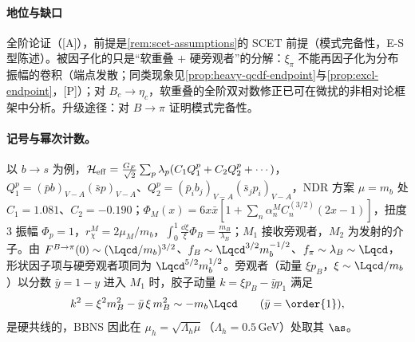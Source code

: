 \paragraph{地位与缺口}
全阶论证（[A]），前提是\cref{rem:scet-assumptions}的 SCET 前提（模式完备性，E-S 型陈述）。被因子化的只是“软重叠 + 硬旁观者”的分解：$\xi_\pi$ 不能再因子化为分布振幅的卷积（端点发散；同类现象见\cref{prop:heavy-qcdf-endpoint}与\cref{prop:excl-endpoint}，[P]）；对 $B_c\to\eta_c$，软重叠的全阶双对数修正已可在微扰的非相对论框架中分析\cite{Bell:2024bxg}。升级途径：对 $B\to\pi$ 证明模式完备性。

\paragraph{记号与幂次计数。}
以 $b\to s$ 为例，$\mathcal H_{\rm eff}=\frac{G_F}{\sqrt2}\sum_{p}\lambda_p(C_1Q_1^p+C_2Q_2^p+\cdots)$，$Q_1^p=(\bar pb)_{V-A}(\bar sp)_{V-A}$、$Q_2^p=(\bar p_ib_j)_{V-A}(\bar s_jp_i)_{V-A}$，NDR 方案 $\mu=m_b$ 处 $C_1=1.081$、$C_2=-0.190$\cite[表~1]{BenekeEtAl2001}；$\Phi_M(x)=6x\bar x[1+\sum_n\alpha_n^MC_n^{(3/2)}(2x-1)]$，扭度 3 振幅 $\Phi_p=1$，$r_\chi^M=2\mu_M/m_b$，$\int_0^1\frac{\dd\xi}{\xi}\Phi_B=\frac{m_B}{\lambda_B}$；$M_1$ 接收旁观者，$M_2$ 为发射的介子。由 $F^{B\to\pi}(0)\sim(\Lqcd/m_b)^{3/2}$、$f_B\sim\Lqcd^{3/2}m_b^{-1/2}$、$f_\pi\sim\lambda_B\sim\Lqcd$，形状因子项与硬旁观者项同为 $\Lqcd^{5/2}m_b^{1/2}$。旁观者（动量 $\xi p_B$，$\xi\sim\Lqcd/m_b$）以分数 $\bar y=1-y$ 进入 $M_1$ 时，胶子动量 $k=\xi p_B-\bar yp_1$ 满足
\begin{equation}\label{eq:heavy-hc-gluon}
k^2=\xi^2m_B^2-\bar y\,\xi\,m_B^2\sim-m_b\Lqcd\qquad(\bar y=\order{1}),
\end{equation}
是硬共线的，BBNS 因此在 $\mu_h=\sqrt{\Lambda_h\mu}$（$\Lambda_h=0.5$\,GeV）处取其 $\as$\cite{BenekeEtAl2001}。

